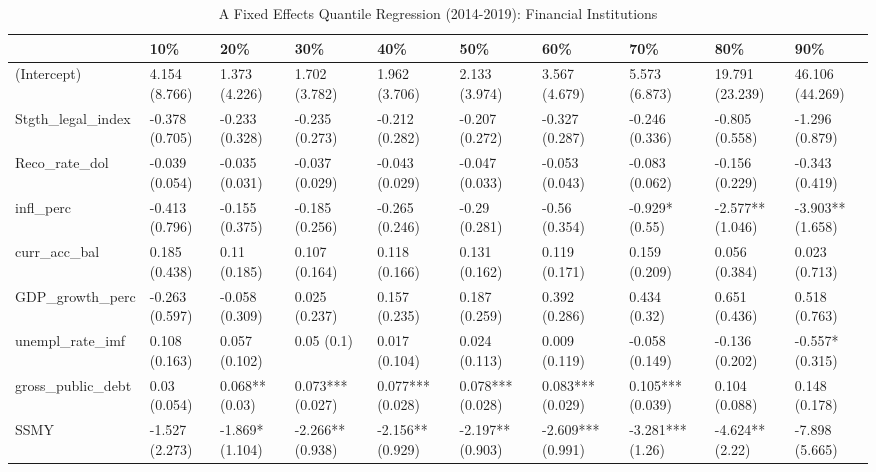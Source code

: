 \begin{table}[ht]
\centering
\caption{A Fixed Effects Quantile Regression (2014-2019): Financial Institutions} 
\begingroup\small
\begin{tabular}{llllllllll}
  \toprule
 & 10\% & 20\% & 30\% & 40\% & 50\% & 60\% & 70\% & 80\% & 90\% \\ 
  \midrule
(Intercept) & 4.154 (8.766) & 1.373 (4.226) & 1.702 (3.782) & 1.962 (3.706) & 2.133 (3.974) & 3.567 (4.679) & 5.573 (6.873) & 19.791 (23.239) & 46.106 (44.269) \\ 
  Stgth\_legal\_index & -0.378 (0.705) & -0.233 (0.328) & -0.235 (0.273) & -0.212 (0.282) & -0.207 (0.272) & -0.327 (0.287) & -0.246 (0.336) & -0.805 (0.558) & -1.296 (0.879) \\ 
  Reco\_rate\_dol & -0.039 (0.054) & -0.035 (0.031) & -0.037 (0.029) & -0.043 (0.029) & -0.047 (0.033) & -0.053 (0.043) & -0.083 (0.062) & -0.156 (0.229) & -0.343 (0.419) \\ 
  infl\_perc & -0.413 (0.796) & -0.155 (0.375) & -0.185 (0.256) & -0.265 (0.246) & -0.29 (0.281) & -0.56 (0.354) & -0.929* (0.55) & -2.577** (1.046) & -3.903** (1.658) \\ 
  curr\_acc\_bal & 0.185 (0.438) & 0.11 (0.185) & 0.107 (0.164) & 0.118 (0.166) & 0.131 (0.162) & 0.119 (0.171) & 0.159 (0.209) & 0.056 (0.384) & 0.023 (0.713) \\ 
  GDP\_growth\_perc & -0.263 (0.597) & -0.058 (0.309) & 0.025 (0.237) & 0.157 (0.235) & 0.187 (0.259) & 0.392 (0.286) & 0.434 (0.32) & 0.651 (0.436) & 0.518 (0.763) \\ 
  unempl\_rate\_imf & 0.108 (0.163) & 0.057 (0.102) & 0.05 (0.1) & 0.017 (0.104) & 0.024 (0.113) & 0.009 (0.119) & -0.058 (0.149) & -0.136 (0.202) & -0.557* (0.315) \\ 
  gross\_public\_debt & 0.03 (0.054) & 0.068** (0.03) & 0.073*** (0.027) & 0.077*** (0.028) & 0.078*** (0.028) & 0.083*** (0.029) & 0.105*** (0.039) & 0.104 (0.088) & 0.148 (0.178) \\ 
  SSMY & -1.527 (2.273) & -1.869* (1.104) & -2.266** (0.938) & -2.156** (0.929) & -2.197** (0.903) & -2.609*** (0.991) & -3.281*** (1.26) & -4.624** (2.22) & -7.898 (5.665) \\ 
   \bottomrule
\end{tabular}
\endgroup
\end{table}
